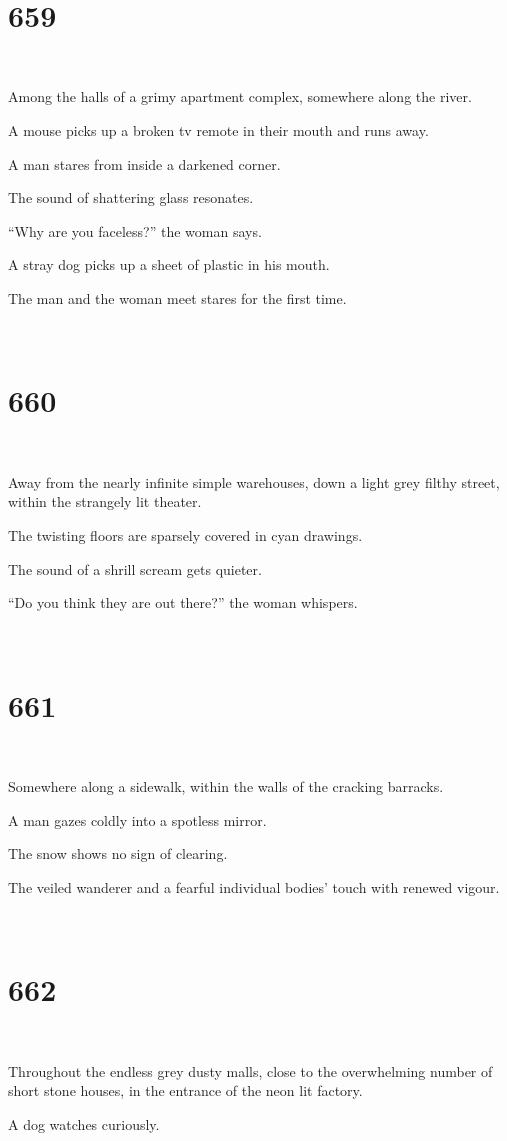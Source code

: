 \documentclass{report}
\begin{document}
~
\chapter*{659}
~

Among the halls of a grimy apartment complex, somewhere along the river.

A mouse picks up a broken tv remote in their mouth and runs away.

A man stares from inside a darkened corner.

The sound of shattering glass resonates.

``Why are you faceless?'' the woman says.

A stray dog picks up a sheet of plastic in his mouth.

The man and the woman meet stares for the first time.

~
\chapter*{660}
~

Away from the nearly infinite simple warehouses, down a light grey filthy street, within the strangely lit theater.

The twisting floors are sparsely covered in cyan drawings.

The sound of a shrill scream gets quieter.

``Do you think they are out there?'' the woman whispers.

~
\chapter*{661}
~

Somewhere along a sidewalk, within the walls of the cracking barracks.

A man gazes coldly into a spotless mirror.

The snow shows no sign of clearing.

The veiled wanderer and a fearful individual bodies' touch with renewed vigour.

~
\chapter*{662}
~

Throughout the endless grey dusty malls, close to the overwhelming number of short stone houses, in the entrance of the neon lit factory.

A dog watches curiously.
\end{document}
